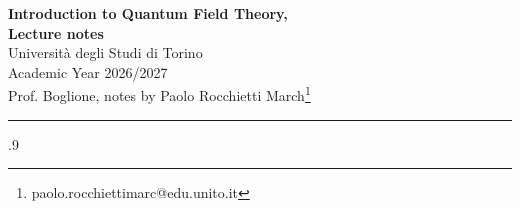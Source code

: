 \documentclass[a4paper,11pt]{article}
\begin{document}
\begin{center}
\Large{\textbf{Introduction to Quantum Field Theory,\\ Lecture notes}}
\vspace{0.4cm}
\normalsize
\\ Università degli Studi di Torino\\Academic Year 2026/2027 \\Prof. Boglione,
notes by Paolo Rocchietti March\footnote{paolo.rocchiettimarc@edu.unito.it} \\

\vspace{0.1cm}
\medskip
\normalsize
\end{center}
\vspace{0.4cm}
{\color{gray}\hrule}
\null\vfill
\vfill\null
\newpage
\begin{spacing}{.9}
\tableofcontents
\end{spacing}
\newpage
\pagestyle{fancy}
\thispagestyle{fancy}
\fancyfoot[C]{\small{\thepage}}
%


























\end{document}
